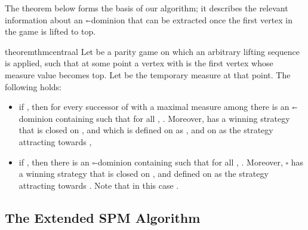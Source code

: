 \documentclass{eptcs}
\newcommand{\odd}{\ensuremath{\square}\xspace}
\begin{document}
 
\noindent
The theorem below forms the basis of our algorithm; it describes
the relevant information about an \odd-dominion that can be extracted
once the first vertex in the game is lifted to top.

\begin{restatable}{theorem}{thmcentraal}
 \label{thm:centraal}
  Let  be a parity game on which an arbitrary lifting sequence is applied, such that at some point a vertex  with  is the first vertex whose measure value becomes top. Let  be the temporary measure at that point. The following holds:
  
  \begin{itemize}
   \item if , then for every successor  of  with a maximal measure among  there is an \odd-dominion  containing  such that for all , . Moreover,  has a winning strategy that is closed on , and which is defined on  as , and on  as the strategy attracting towards ,
   \item if , then there is an \odd-dominion  containing  such that for all , . Moreover,  \odd has a winning strategy  that is closed on , and defined on  as the strategy attracting towards .  Note that in this case . 
   \end{itemize}     
     
 \end{restatable} 

\subsection{The Extended SPM Algorithm}

\def\res{\textsf{RES}}
\def\rem{\textsf{REM}}
\def\irr{\textsf{IRR}}
\def\dom{\textsf{DOM}}
\def\newspm{\textsf{SPM-Within}}
\end{document}
